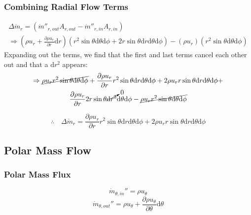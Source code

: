 \documentclass[12pt, letterpaper, twoside]{article}
\begin{document}
        \subsubsection{Combining Radial Flow Terms}
            \begin{multline*}
                \Delta\dot{m}_r = (\dot{m}''_{r,out} A_{r,out} - \dot{m}''_{r,in} A_{r,in}) 
                \\\Rightarrow
                \left(\rho u_r  + \frac{\partial \rho u_r}{\partial r} \textrm{d}r\right)\left(r^2 \sin\theta \textrm{d}\theta \textrm{d}\phi + 2r\sin\theta \textrm{d}r \textrm{d}\theta \textrm{d}\phi\right) -
                \left(\rho u_r\right)\left(r^2 \sin\theta \textrm{d}\theta \textrm{d}\phi\right)
            \end{multline*}
            Expanding out the terms, we find that the first and last terms cancel each other out and that a \(\textrm{d}r^2\) appears:
            \begin{multline*}
                \Rightarrow
                \cancel{\rho u_r r^2 \sin\theta \textrm{d}\theta \textrm{d}\phi} +
                \frac{\partial \rho u_r}{\partial r} r^2 \sin\theta \textrm{d}r \textrm{d}\theta \textrm{d}\phi +
                2\rho u_r r\sin\theta \textrm{d}r \textrm{d}\theta \textrm{d}\phi + \\
                \frac{\partial \rho u_r}{\partial r} 2r\sin\theta \cancelto{0}{\textrm{d}r^2} \textrm{d}\theta \textrm{d}\phi - 
                \cancel{\rho u_r r^2 \sin\theta \textrm{d}\theta \textrm{d}\phi}
            \end{multline*}

            \begin{equation}\label{eq:mdotr}
                \therefore\quad
                \boxed{\Delta\dot{m}_r = \frac{\partial \rho u_r}{\partial r} r^2 \sin\theta \textrm{d}r \textrm{d}\theta \textrm{d}\phi +
                2\rho u_r r\sin\theta \textrm{d}r \textrm{d}\theta \textrm{d}\phi}
            \end{equation}

    \subsection{Polar Mass Flow}
        \subsubsection{Polar Mass Flux}
            \begin{equation}
                \dot{m}_{\theta,in}'' = \rho u_{\theta}
            \end{equation}
            \begin{equation}
                \dot{m}_{\theta,out}'' = \rho u_{\theta}  +
                \frac{\partial \rho u_{\theta}}{\partial \theta} \textrm{d}\theta
            \end{equation}
\end{document}

